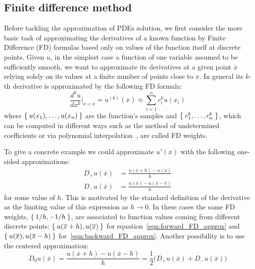 
\subsection{Finite difference method}
\label{subsec:finite_difference_methods}

Before tackling the approximation of PDEs solution, we first consider the more basic task of approximating the derivatives of a known function by Finite Difference (FD) formulas based only on values of the function itself at discrete points. Given $u$, in the simplest case a function of one variable assumed to be sufficiently smooth, we want to approximate its derivatives at a given point $\overline{x}$ relying solely on its values at a finite number of points close to $\overline{x}$. In general its $k$-th derivative is approximated by the following FD formula:
\begin{equation}
	\frac{d^k u}{dx^k}\bigg|_{x=\overline{x}} = u^{(k)}(\overline{x}) \approx \sum_{i=1}^{n} c_{i}^{k} u(x_i)
\end{equation}
where $\Set{u(x_1), \dots, u(x_n)}$ are the function's samples and $\Set{c_{1}^{k}, \dots, c_{n}^{k}}$, which can be computed in different ways such as the method of undetermined coefficients or via polynomial interpolation~\cite{LeVeque:FD_book}, are called FD weights.

To give a concrete example we could approximate $u'(\overline{x})$ with the following one-sided approximations:
\begin{subequations}
	\begin{align}
		D_+ u(\overline{x}) & = \frac{u(\overline{x}+h) - u(\overline{x})}{h}  \label{eqn:forward_FD_approx}\\
		D_- u(\overline{x}) & = \frac{u(\overline{x}) - u(\overline{x}-h)}{h}  \label{eqn:backward_FD_approx}
	\end{align}
\end{subequations}
for some value of $ h$. This is motivated by the standard definition of the derivative as the limiting value of this expression as $h \to 0$. In these cases the same FD weights, $\Set{1/h, - 1/h}$, are associated to function values coming from different discrete points: $\Set{u(\overline{x}+h), u(\overline{x})}$ for equation~\eqref{eqn:forward_FD_approx} and $\Set{u(\overline{x}), u(\overline{x}-h)}$ for~\eqref{eqn:backward_FD_approx}. Another possibility is to use the centered approximation:
\begin{equation}
	D_0 u(\overline{x}) = \frac{u(\overline{x}+h) - u(\overline{x}-h)}{h} = \frac{1}{2} \bigl( D_+ u(\overline{x}) + D_- u(\overline{x}) \bigr)
\end{equation}

